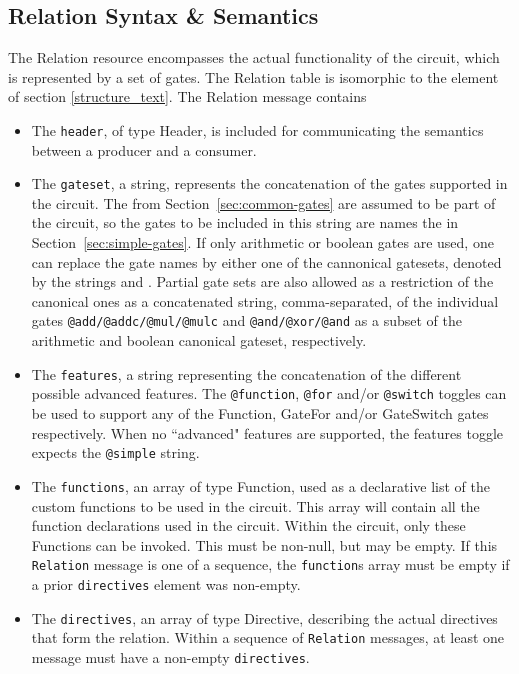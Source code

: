 \subsection{Relation Syntax \& Semantics}

The \textsf{Relation} resource encompasses the actual functionality of the circuit, which is represented by a set of gates. The \textsf{Relation} table is isomorphic to the  element of section \ref{structure_text}. The \textsf{Relation} message contains
\begin{itemize}
    \item The \texttt{header}, of type \textsf{Header}, is included for communicating the semantics between a producer and a consumer.
    \item The \texttt{gateset}, a string, represents the concatenation of the gates supported in the circuit. The  from Section~\ref{sec:common-gates} are assumed to be part of the circuit, so the gates to be included in this string are names the  in Section~\ref{sec:simple-gates}. If only arithmetic or boolean gates are used, one can replace the gate names by either one of the cannonical gatesets, denoted by the strings  and . Partial gate sets are also allowed as a restriction of the canonical ones as a concatenated string, comma-separated, of the individual gates \texttt{@add/@addc/@mul/@mulc} and \texttt{@and/@xor/@and} as a subset of the arithmetic and boolean canonical gateset, respectively.
    \item The \texttt{features}, a string representing the concatenation of the different possible advanced features. The \texttt{@function}, \texttt{@for} and/or \texttt{@switch} toggles can be used to support any of the \textsf{Function}, \textsf{GateFor} and/or \textsf{GateSwitch} gates respectively. When no ``advanced" features are supported, the features toggle expects the \texttt{@simple} string.
    \item The \texttt{functions}, an array of type \textsf{Function}, used as a declarative list of the custom functions to be used in the circuit. This array will contain all the function declarations used in the circuit. Within the circuit, only these \textsf{Functions} can be invoked.
    This must be non-null, but may be empty. If this \texttt{Relation} message is one of a sequence, the \texttt{function}s array must be empty if a prior \texttt{directives} element was non-empty.
    \item The \texttt{directives}, an array of type \textsf{Directive}, describing the actual directives that form the relation. Within a sequence of \texttt{Relation} messages, at least one message must have a non-empty \texttt{directives}.
\end{itemize}

